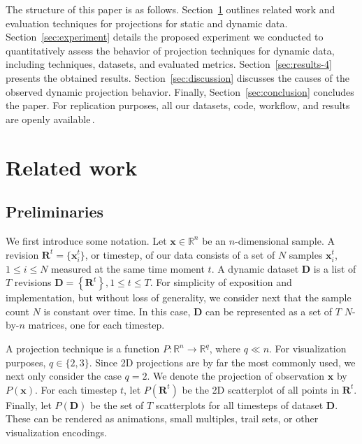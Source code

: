 The structure of this paper is as follows. Section~\ref{sec:related} outlines related work and evaluation techniques for projections for static and dynamic data. Section~\ref{sec:experiment} details the proposed experiment we conducted to quantitatively assess the behavior of projection techniques for dynamic data, including techniques, datasets, and evaluated metrics. Section~\ref{sec:results-4} presents the obtained results. Section~\ref{sec:discussion} discusses the causes of the observed dynamic projection behavior. Finally, Section~\ref{sec:conclusion} concludes the paper. For replication purposes, all our datasets, code, workflow, and results are openly available\,\cite{repo}.


\section{Related work}
\label{sec:related}

\subsection{Preliminaries}
\label{sec:preliminaries}
%
We first introduce some notation. Let
$\mathbf{x} \in \mathbb{R}^n$
be an $n$-dimensional sample. A revision $\mathbf{R}^t = \{\mathbf{x}_i^t\}$, or timestep, of our data consists of a set of $N$ samples $\mathbf{x}_i^t$, $1 \leq i \leq N$ measured at the same time moment $t$. A dynamic dataset $\mathbf{D}$ is a list of $T$ revisions $\mathbf{D}=\left \{ \mathbf{R}^{t} \right \}, 1 \leq t \leq T$. For simplicity of exposition and implementation, but without loss of generality, we consider next that the sample count $N$ is constant over time. In this case, $\mathbf{D}$ can be represented as a set of $T$ $N$-by-$n$ matrices, one for each timestep.

A projection technique is a function $P: \mathbb{R}^{n} \rightarrow \mathbb{R}^{q}$, where $q \ll n$. For visualization purposes, $q \in \{2,3\}$. Since 2D projections are by far the most commonly used, we next only consider the case $q=2$. We denote the projection of observation $\mathbf{x}$ by $P(\mathbf{x})$. For each timestep $t$, let $P(\mathbf{R}^{t})$ be the 2D scatterplot of all points in
$\mathbf{R}^{t}$. Finally, let $P(\mathbf{D})$ be the set of $T$ scatterplots for all timesteps of dataset $\mathbf{D}$. These can be rendered as animations, small multiples, trail sets, or other visualization encodings.

